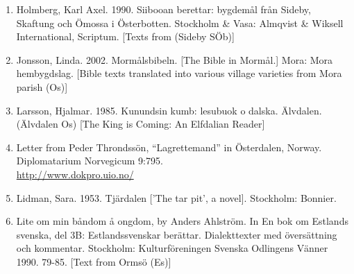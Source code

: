 \begin{enumerate}

\item[\sqbrSenum]

\label{bkm:Ref154213910}Holmberg, Karl Axel. 1990. Siibooan berettar: bygdemål från Sideby, Skaftung och Ömossa i Österbotten. Stockholm \& Vasa: Almqvist \& Wiksell International, Scriptum. [Texts from (Sideby SÖb)]

\item[\sqbrSenum]

\label{bkm:Ref150065702}\label{bkm:Ref261882727}Jonsson, Linda. 2002. Mormålsbibeln. [The Bible in Mormål.] Mora: Mora hembygdslag. [Bible texts translated into various village varieties from Mora parish (Os)] 


\item[\sqbrSenum]

\label{bkm:Ref173049435}Larsson, Hjalmar. 1985. Kunundsin kumb: lesubuok o dalska. Älvdalen. (Älvdalen Os) [The King is Coming: An Elfdalian Reader]

\item[\sqbrSenum]

Letter from Peder Throndssön, “Lagrettemand” in Österdalen, Norway. Diplomatarium Norvegicum 9:795.\\
\url{http://www.dokpro.uio.no/}

\item[\sqbrSenum]

\label{bkm:Ref150578023}Lidman, Sara. 1953. Tjärdalen [’The tar pit’, a novel]. Stockholm: Bonnier.


\item[\sqbrSenum]

\label{bkm:Ref169951680}Lite om min båndom å ongdom, by Anders Ahlström. In En bok om Estlands svenska, del 3B: Estlandssvenskar berättar. Dialekttexter med översättning och kommentar. Stockholm: Kulturföreningen Svenska Odlingens Vänner 1990. 79-85. [Text from Ormsö (Es)]


\end{enumerate}
